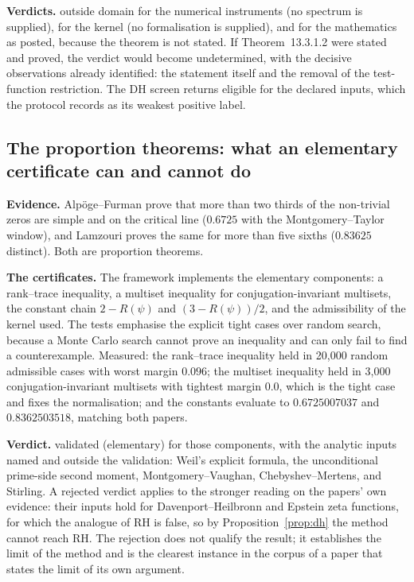 \documentclass[11pt,a4paper]{article}
\newcommand{\RH}{\mathrm{RH}}
\newcommand{\verdict}[1]{\textsf{#1}}
\begin{document}
\textbf{Verdicts.} \verdict{outside domain} for the numerical instruments (no spectrum is
supplied), for the kernel (no formalisation is supplied), and for the mathematics as posted,
because the theorem is not stated. If Theorem~13.3.1.2 were stated and proved, the verdict would
become \verdict{undetermined}, with the decisive observations already identified: the statement
itself and the removal of the test-function restriction. The DH screen returns \verdict{eligible}
for the declared inputs, which the protocol records as its weakest positive label.

\subsection{The proportion theorems: what an elementary certificate can and cannot do}

\textbf{Evidence.} Alp\"oge--Furman \cite{alpogefurman} prove that more than two thirds of
the non-trivial zeros are simple and on the critical line ($0.6725$ with the Montgomery--Taylor
window), and Lamzouri \cite{lamzouri} proves the same for more than five sixths ($0.83625$
distinct). Both are proportion theorems.

\textbf{The certificates.} The framework implements the elementary components: a
rank--trace inequality, a multiset inequality for conjugation-invariant multisets, the constant
chain $2-R(\psi)$ and $(3-R(\psi))/2$, and the admissibility of the kernel used. The tests
emphasise the explicit tight cases over random search, because a Monte Carlo search cannot prove an
inequality and can only fail to find a counterexample. Measured: the rank--trace inequality held in
20{,}000 random admissible cases with worst margin $0.096$; the multiset inequality held in
3{,}000 conjugation-invariant multisets with tightest margin $0.0$, which is the tight case and
fixes the normalisation; and the constants evaluate to $0.6725007037$ and $0.8362503518$, matching
both papers.

\textbf{Verdict.} \verdict{validated (elementary)} for those components, with the analytic
inputs named and outside the validation: Weil's explicit formula, the unconditional prime-side
second moment, Montgomery--Vaughan, Chebyshev--Mertens, and Stirling. A \verdict{rejected} verdict
applies to the stronger reading on the papers' own evidence: their inputs hold for
Davenport--Heilbronn and Epstein zeta functions, for which the analogue of $\RH$ is false, so by
Proposition~\ref{prop:dh} the method cannot reach $\RH$. The rejection does not qualify the result;
it establishes the limit of the method and is the clearest instance in the corpus of a paper that
states the limit of its own argument.
\end{document}
